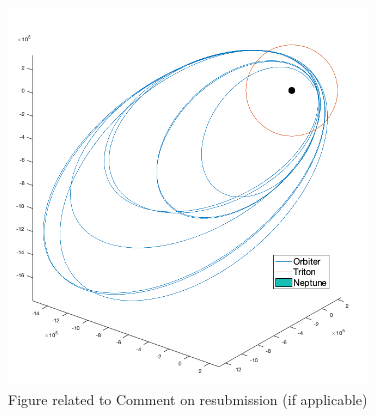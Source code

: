 \documentclass[12pt]{article}
\begin{document}
\begin{figure}[htbp]
    \centering
    \includegraphics[width=0.85\textwidth]{images/comment_on_resubmission_(if_applicable)_img_1.png}
    \caption{Figure related to Comment on resubmission (if applicable)}
    \label{fig:comment_on_resubmission_(if_applicable)_1}
\end{figure}
\end{document}
